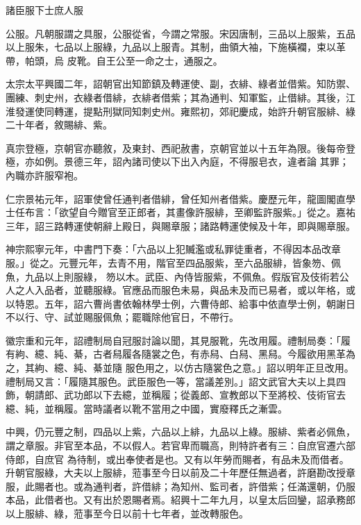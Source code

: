 
\begin{pinyinscope}

 諸臣服下士庶人服



 公服。凡朝服謂之具服，公服從省，今謂之常服。宋因唐制，三品以上服紫，五品以上服朱，七品以上服綠，九品以上服青。其制，曲領大袖，下施橫襴，束以革帶，帕頭，烏
 皮靴。自王公至一命之士，通服之。



 太宗太平興國二年，詔朝官出知節鎮及轉運使、副，衣緋、綠者並借紫。知防禦、團練、刺史州，衣綠者借緋，衣緋者借紫；其為通判、知軍監，止借緋。其後，江淮發運使同轉運，提點刑獄同知刺史州。雍熙初，郊祀慶成，始許升朝官服緋、綠二十年者，敘賜緋、紫。



 真宗登極，京朝官亦聽敘，及東封、西祀赦書，京朝官並以十五年為限。後每帝登極，亦如例。景德三年，詔內諸司使以下出入內庭，不得服皂衣，違者論
 其罪；內職亦許服窄袍。



 仁宗景祐元年，詔軍使曾任通判者借緋，曾任知州者借紫。慶歷元年，龍圖閣直學士任布言：「欲望自今贈官至正郎者，其畫像許服緋，至卿監許服紫。」從之。嘉祐三年，詔三路轉運使朝辭上殿日，與賜章服；諸路轉運使候及十年，即與賜章服。



 神宗熙寧元年，中書門下奏：「六品以上犯贓濫或私罪徒重者，不得因本品改章服。」從之。元豐元年，去青不用，階官至四品服紫，至六品服緋，皆象笏、佩魚，九品以上則服綠，
 笏以木。武臣、內侍皆服紫，不佩魚。假版官及伎術若公人之人入品者，並聽服綠。官應品而服色未易，與品未及而已易者，或以年格，或以特恩。五年，詔六曹尚書依翰林學士例，六曹侍郎、給事中依直學士例，朝謝日不以行、守、試並賜服佩魚；罷職除他官日，不帶行。



 徽宗重和元年，詔禮制局自冠服討論以聞，其見服靴，先改用履。禮制局奏：「履有絇、繶、純、綦，古者舄履各隨裳之色，有赤舄、白舄、黑舄。今履欲用黑革為之，其絇、繶、純、綦並隨
 服色用之，以仿古隨裳色之意。」詔以明年正旦改用。禮制局又言：「履隨其服色。武臣服色一等，當議差別。」詔文武官大夫以上具四飾，朝請郎、武功郎以下去繶，並稱履；從義郎、宣教郎以下至將校、伎術官去繶、純，並稱履。當時議者以靴不當用之中國，實廢釋氏之漸雲。



 中興，仍元豐之制，四品以上紫，六品以上緋，九品以上綠。服緋、紫者必佩魚，謂之章服。非官至本品，不以假人。若官卑而職高，則特許者有三：自庶官遷六部侍郎，自庶官
 為待制，或出奉使者是也。又有以年勞而賜者，有品未及而借者。升朝官服綠，大夫以上服緋，蒞事至今日以前及二十年歷任無過者，許磨勘改授章服，此賜者也。或為通判者，許借緋；為知州、監司者，許借紫；任滿還朝，仍服本品，此借者也。又有出於恩賜者焉。紹興十二年九月，以皇太后回鑾，詔承務郎以上服緋、綠，蒞事至今日以前十七年者，並改轉服色。




\end{pinyinscope}

